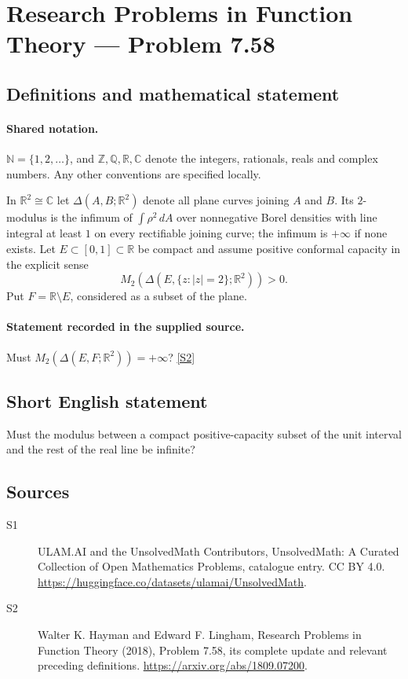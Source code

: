 \documentclass[11pt]{article}
\newcommand{\sref}[2]{\hyperlink{source:#1:#2}{[S#2]}}
\begin{document}
\section{Research Problems in Function Theory — Problem 7.58}\label{statement}

\subsection{Definitions and mathematical statement}

\paragraph{Shared notation.}$\mathbb N=\{1,2,\ldots\}$, and $\mathbb Z,\mathbb Q,\mathbb R,\mathbb C$ denote the integers, rationals, reals and complex numbers. Any other conventions are specified locally.


In $\mathbb R^2\cong\mathbb C$ let $\Delta(A,B;\mathbb R^2)$ denote all plane curves joining $A$ and $B$. Its $2$-modulus is the infimum of $\int\rho^2\,dA$ over nonnegative Borel densities with line integral at least $1$ on every rectifiable joining curve; the infimum is $+\infty$ if none exists. Let $E\subset[0,1]\subset\mathbb R$ be compact and assume positive conformal capacity in the explicit sense
\[M_2(\Delta(E,\{z:|z|=2\};\mathbb R^2))>0.
\]
Put $F=\mathbb R\setminus E$, considered as a subset of the plane.
\paragraph{Statement recorded in the supplied source.}
Must $M_2(\Delta(E,F;\mathbb R^2))=+\infty$? \sref{statement}{2}
\subsection{Short English statement}
Must the modulus between a compact positive-capacity subset of the unit interval and the rest of the real line be infinite?
\subsection{Sources}
\begin{description}
\item[\hypertarget{source:statement:1}{S1}] ULAM.AI and the UnsolvedMath Contributors, UnsolvedMath: A Curated Collection of Open Mathematics Problems, catalogue entry. CC BY 4.0. \url{https://huggingface.co/datasets/ulamai/UnsolvedMath}.
\item[\hypertarget{source:statement:2}{S2}] Walter K. Hayman and Edward F. Lingham, Research Problems in Function Theory (2018), Problem 7.58, its complete update and relevant preceding definitions. \url{https://arxiv.org/abs/1809.07200}.
\end{description}
\label{end:statement}
\end{document}
